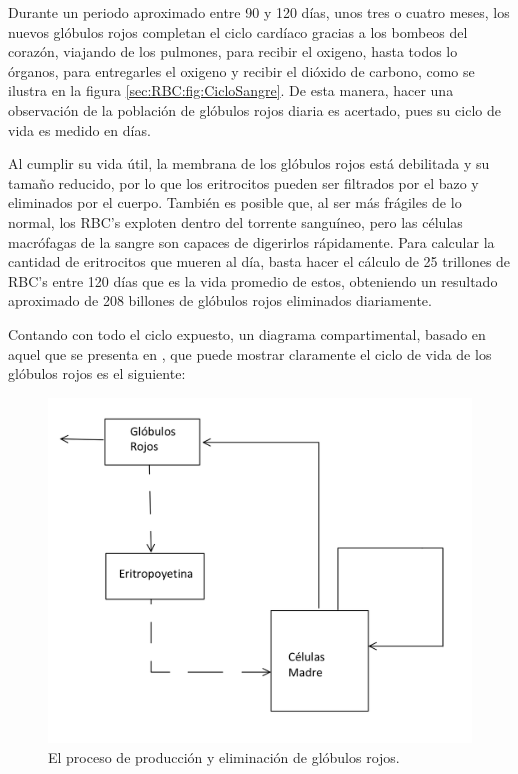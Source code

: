 Durante un periodo aproximado entre 90 y 120 días, unos tres o cuatro meses, los nuevos glóbulos rojos completan el ciclo cardíaco gracias a los bombeos del corazón, viajando de los pulmones, para recibir el oxigeno, hasta todos lo órganos, para entregarles el oxigeno y recibir el dióxido de carbono, como se ilustra en la figura \ref{sec:RBC:fig:CicloSangre}. De esta manera, hacer una observación de la población de glóbulos rojos diaria es acertado, pues su ciclo de vida es medido en días.

Al cumplir su vida útil, la membrana de los glóbulos rojos está debilitada y su tamaño reducido, por lo que los eritrocitos pueden ser filtrados por el bazo y eliminados por el cuerpo. También es posible que, al ser más frágiles de lo normal, los RBC's exploten dentro del torrente sanguíneo, pero las células macrófagas de la sangre son capaces de digerirlos rápidamente. Para calcular la cantidad de eritrocitos que mueren al día, basta hacer el cálculo de 25 trillones de RBC's entre 120 días que es la vida promedio de estos, obteniendo un resultado aproximado de 208 billones de glóbulos rojos eliminados diariamente.

Contando con todo el ciclo expuesto, un diagrama compartimental, basado en aquel que se presenta en \cite{kirk1968mathematical}, que puede mostrar claramente el ciclo de vida de los glóbulos rojos es el siguiente:

\begin{figure}[H]
    \centering
    \includegraphics[scale=0.3]{figures/VidaRBC.jpeg}
    \caption{El proceso de producción y eliminación de glóbulos rojos.}
    \label{sec:RBC:fig:VidaRBC}
\end{figure}

